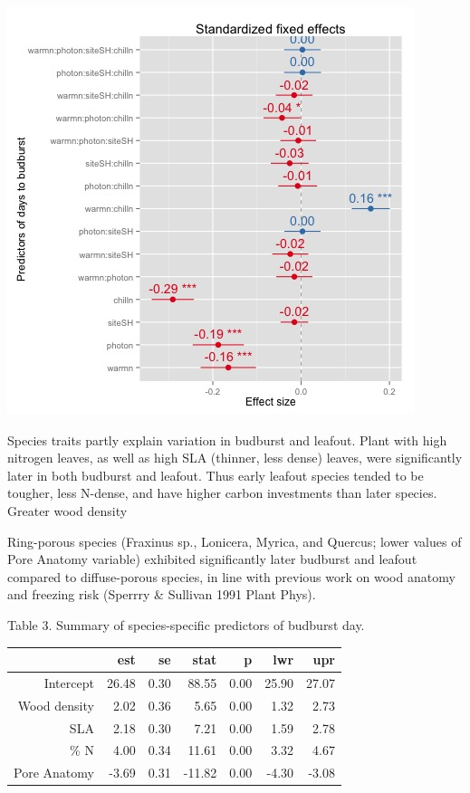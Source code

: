 \documentclass[11pt]{article}
\begin{document}
\includegraphics[scale=0.5]{bdaylmer}


Species traits partly explain variation in budburst and leafout. Plant with high nitrogen leaves, as well as high SLA (thinner, less dense) leaves, were significantly later in both budburst and leafout. Thus early leafout species tended to be tougher, less N-dense, and have higher carbon investments than later species. Greater wood density

Ring-porous species (Fraxinus sp., Lonicera, Myrica, and Quercus; lower values of Pore Anatomy variable) exhibited significantly later budburst and leafout compared to diffuse-porous species, in line with previous work on wood anatomy and freezing risk (Sperrry \& Sullivan 1991 Plant Phys).


Table 3. Summary of species-specific predictors of budburst day. 
\begin{table}[ht]
\centering
\begin{tabular}{rrrrrrr}
  \hline
 & est & se & stat & p & lwr & upr \\ 
  \hline
Intercept & 26.48 & 0.30 & 88.55 & 0.00 & 25.90 & 27.07 \\ 
  Wood density & 2.02 & 0.36 & 5.65 & 0.00 & 1.32 & 2.73 \\ 
  SLA & 2.18 & 0.30 & 7.21 & 0.00 & 1.59 & 2.78 \\ 
  \% N & 4.00 & 0.34 & 11.61 & 0.00 & 3.32 & 4.67 \\ 
  Pore Anatomy & -3.69 & 0.31 & -11.82 & 0.00 & -4.30 & -3.08 \\ 
   \hline
\end{tabular}
\end{table}
\end{document}
